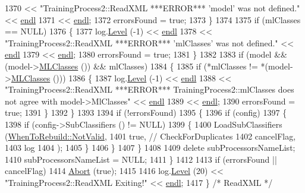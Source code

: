 \begin{DoxyCode}
1370         << \textcolor{stringliteral}{"TrainingProcess2::ReadXML   ***ERROR***   'model' was not defined."} << 
      \hyperlink{namespace_k_k_b_ad1f50f65af6adc8fa9e6f62d007818a8}{endl}
1371         << \hyperlink{namespace_k_k_b_ad1f50f65af6adc8fa9e6f62d007818a8}{endl};
1372       errorsFound = \textcolor{keyword}{true};
1373     \}
1374 
1375     \textcolor{keywordflow}{if}  (mlClasses == NULL)
1376     \{
1377       log.\hyperlink{class_k_k_b_1_1_run_log_a32cf761d7f2e747465fd80533fdbb659}{Level} (-1) << \hyperlink{namespace_k_k_b_ad1f50f65af6adc8fa9e6f62d007818a8}{endl}
1378         << \textcolor{stringliteral}{"TrainingProcess2::ReadXML   ***ERROR***   'mlClasses' was not defined."} << 
      \hyperlink{namespace_k_k_b_ad1f50f65af6adc8fa9e6f62d007818a8}{endl}
1379         << \hyperlink{namespace_k_k_b_ad1f50f65af6adc8fa9e6f62d007818a8}{endl};
1380       errorsFound = \textcolor{keyword}{true};
1381     \}
1382 
1383     \textcolor{keywordflow}{if}  (model  &&  (model->\hyperlink{class_k_k_m_l_l_1_1_model_adebde57c62484e9599bcd1da57ec1f4f}{MLClasses} ())  &&  mlClasses)
1384     \{
1385       \textcolor{keywordflow}{if}  (*mlClasses != *(model->\hyperlink{class_k_k_m_l_l_1_1_model_adebde57c62484e9599bcd1da57ec1f4f}{MLClasses} ()))
1386       \{
1387         log.\hyperlink{class_k_k_b_1_1_run_log_a32cf761d7f2e747465fd80533fdbb659}{Level} (-1) << \hyperlink{namespace_k_k_b_ad1f50f65af6adc8fa9e6f62d007818a8}{endl}
1388           << \textcolor{stringliteral}{"TrainingProcess2::ReadXML   ***ERROR***   TrainingProcess2::mlClasses  does not agree with
       model->MlClasses"} << \hyperlink{namespace_k_k_b_ad1f50f65af6adc8fa9e6f62d007818a8}{endl}
1389           << \hyperlink{namespace_k_k_b_ad1f50f65af6adc8fa9e6f62d007818a8}{endl};
1390         errorsFound = \textcolor{keyword}{true};
1391       \}
1392     \}
1393 
1394     \textcolor{keywordflow}{if} (!errorsFound)
1395     \{
1396       \textcolor{keywordflow}{if}  (config)
1397       \{
1398         \textcolor{keywordflow}{if}  (config->SubClassifiers () != NULL)
1399         \{
1400           LoadSubClassifiers (\hyperlink{class_k_k_m_l_l_1_1_training_process2_acc48e76f6978c8c8c0c849eec2d0ee53a04665ec171e86ef749cc563d7bdeec91}{WhenToRebuild::NotValid},
1401                               \textcolor{keyword}{true},    \textcolor{comment}{// CheckForDuplicates}
1402                               cancelFlag,
1403                               log
1404                              );
1405         \}
1406       \}
1407     \}
1408 
1409     \textcolor{keyword}{delete}  subProcessorsNameList;
1410     subProcessorsNameList = NULL;
1411   \}
1412 
1413   \textcolor{keywordflow}{if}  (errorsFound  ||  cancelFlag)
1414      \hyperlink{class_k_k_m_l_l_1_1_training_process2_a5e5fad4ad447c8fdb38ab59da4c17aff}{Abort} (\textcolor{keyword}{true});
1415 
1416   log.\hyperlink{class_k_k_b_1_1_run_log_a32cf761d7f2e747465fd80533fdbb659}{Level} (20) << \textcolor{stringliteral}{"TrainingProcess2::ReadXML    Exiting!"} << \hyperlink{namespace_k_k_b_ad1f50f65af6adc8fa9e6f62d007818a8}{endl};
1417 \}  \textcolor{comment}{/* ReadXML */}
\end{DoxyCode}
